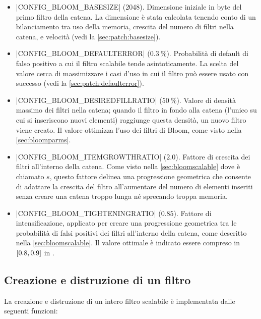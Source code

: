 \medskip
\begin{itemize}
  \item \cverb|CONFIG_BLOOM_BASESIZE| (\SI{2048}{\byte}). Dimensione iniziale in byte del primo
  filtro della catena. La dimensione è stata calcolata tenendo conto di un bilanciamento tra uso
  della memoria, crescita del numero di filtri nella catena, e velocità (vedi la
  \autoref{sec:patch:basesize}).

  \item \cverb|CONFIG_BLOOM_DEFAULTERROR| ($\SI{0.3}{\percent}$). Probabilità di default di falso
  positivo a cui il filtro scalabile tende asintoticamente. La scelta del valore cerca di
  massimizzare i casi d'uso in cui il filtro può essere usato con successo (vedi la
  \autoref{sec:patch:defaulterror}).

  \item \cverb|CONFIG_BLOOM_DESIREDFILLRATIO| ($\SI{50}{\percent}$). Valore di densità massimo dei filtri
  nella catena; quando il filtro in fondo alla catena (l'unico su cui si inseriscono nuovi elementi)
  raggiunge questa densità, un nuovo filtro viene creato. Il valore ottimizza l'uso dei filtri di
  Bloom, come visto nella \autoref{sec:bloomparms}.

  \item \cverb|CONFIG_BLOOM_ITEMGROWTHRATIO| ($\num{2.0}$). Fattore di crescita dei filtri
  all'interno della catena. Come visto nella \autoref{sec:bloomscalable} dove è chiamato
  $s$, questo fattore delinea una progressione geometrica che consente di adattare la crescita del
  filtro all'aumentare del numero di elementi inseriti senza creare una catena troppo lunga
  né sprecando troppa memoria.

  \item \cverb|CONFIG_BLOOM_TIGHTENINGRATIO| ($\num{0.85}$). Fattore di intensificazione, applicato
  per creare una progressione geometrica tra le probabilità di falsi positivi dei filtri all'interno
  della catena, come descritto nella \autoref{sec:bloomscalable}. Il valore ottimale è indicato
  essere compreso in $\interval{0.8}{0.9}$ in \cite{bloom-scalable}.

\end{itemize}
\medskip

\subsection{Creazione e distruzione di un filtro}

La creazione e distruzione di un intero filtro scalabile è implementata dalle seguenti funzioni:


